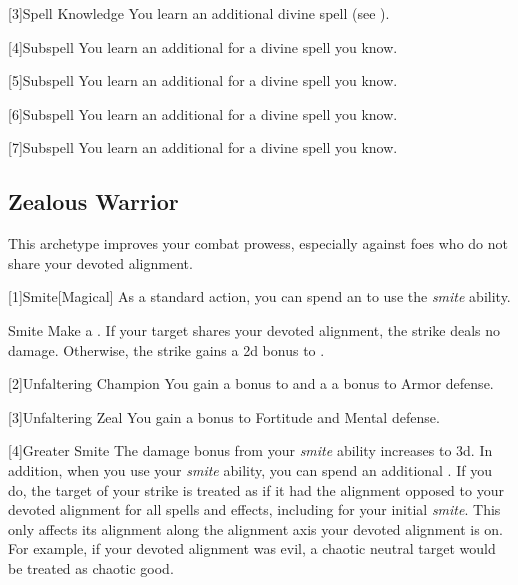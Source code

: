         [3]{Spell Knowledge}
        You learn an additional divine spell (see ).

        [4]{Subspell}
        You learn an additional  for a divine spell you know.

        [5]{Subspell}
        You learn an additional  for a divine spell you know.

        [6]{Subspell}
        You learn an additional  for a divine spell you know.

        [7]{Subspell}
        You learn an additional  for a divine spell you know.

    \subsection{Zealous Warrior}
        This archetype improves your combat prowess, especially against foes who do not share your devoted alignment.

        [1]{Smite}[Magical] As a standard action, you can spend an  to use the \textit{smite} ability.
        \begin{ability}{Smite}
            Make a .
            If your target shares your devoted alignment, the strike deals no damage.
            Otherwise, the strike gains a \plus2d bonus to .
        \end{ability}

        [2]{Unfaltering Champion}
        You gain a  bonus to  and a a  bonus to Armor defense.

        [3]{Unfaltering Zeal}
        You gain a  bonus to Fortitude and Mental defense.

        [4]{Greater Smite} The damage bonus from your \textit{smite} ability increases to \plus3d.
        In addition, when you use your \textit{smite} ability, you can spend an additional .
        If you do, the target of your strike is treated as if it had the alignment opposed to your devoted alignment for all spells and effects, including for your initial \textit{smite}.
        This only affects its alignment along the alignment axis your devoted alignment is on.
        For example, if your devoted alignment was evil, a chaotic neutral target would be treated as chaotic good.

